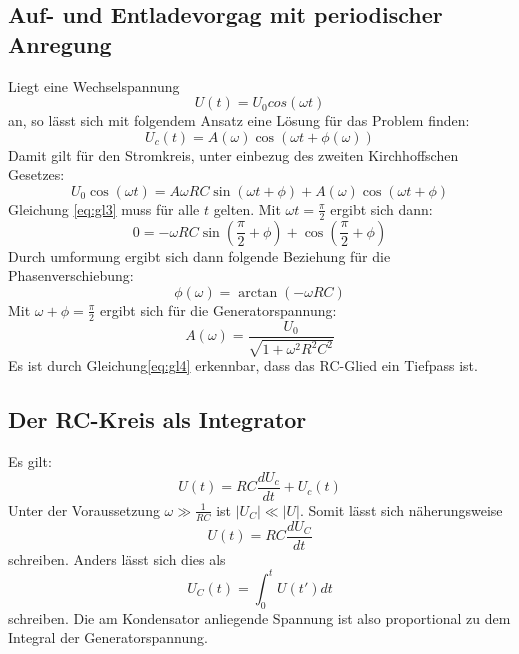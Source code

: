 \subsection{Auf- und Entladevorgag mit periodischer Anregung}
Liegt eine Wechselspannung
\begin{equation}
  U(t)=U_0 cos(\omega t)
\end{equation}
an, so lässt sich mit folgendem Ansatz eine Lösung für das Problem finden:
\begin{equation}
  U_c(t)= A(\omega) \cos{(\omega t + \phi(\omega))}
\end{equation}
Damit gilt für den Stromkreis, unter einbezug des zweiten Kirchhoffschen Gesetzes:
\begin{equation}
  \label{eq:gl3}
  U_0 \cos{(\omega t)} = A \omega R C \sin{(\omega t + \phi)} + A(\omega)\cos{(\omega t + \phi)}
\end{equation}
Gleichung \eqref{eq:gl3} muss für alle $t$ gelten. Mit $\omega t= \frac{\pi}{2}$ ergibt sich dann:
\begin{equation}
  0 = - \omega R C \sin{(\frac{\pi}{2}+\phi)} + \cos{(\frac{\pi}{2}+\phi)}
\end{equation}
Durch umformung ergibt sich dann folgende Beziehung für die Phasenverschiebung:
\begin{equation}
  \phi(\omega)=\arctan{(- \omega R C)}
    \label{eqn:phasetheorie}
\end{equation}
Mit $\omega +\phi =\frac{\pi}{2}$ ergibt sich für die Generatorspannung:
\begin{equation}
  \label{eq:gl4}
  A(\omega)= \frac{U_0}{\sqrt{1+\omega^2 R^2 C^2}}
\end{equation}
Es ist durch Gleichung\eqref{eq:gl4} erkennbar, dass das RC-Glied ein Tiefpass ist.

\subsection{Der RC-Kreis als Integrator}
Es gilt:
\begin{equation}
  U(t)= RC \frac{dU_c}{dt} + U_c(t)
\end{equation}
Unter der Voraussetzung $\omega \gg\frac{1}{RC}$ ist $|U_C| \ll|U|$.
Somit lässt sich näherungsweise
\begin{equation}
  U(t)=RC \frac{dU_C}{dt}
\end{equation}
schreiben.
Anders lässt sich dies als
\begin{equation}
  U_C(t)=\int_0^t U(t') dt
\end{equation}
schreiben.
Die am Kondensator anliegende Spannung ist also proportional zu dem Integral der Generatorspannung.
